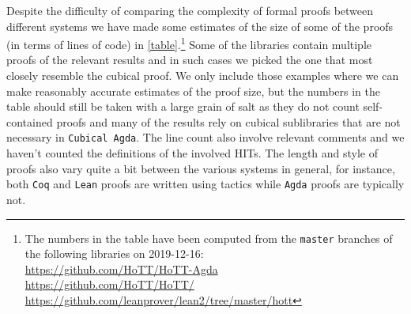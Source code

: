 Despite the difficulty of comparing the complexity of formal proofs
between different systems we have made some estimates of the size of
some of the proofs (in terms of lines of code) in
\cref{table}.\footnote{The numbers in the table have been computed
  from the \texttt{master} branches of the following libraries on
  2019-12-16:\\ \url{https://github.com/HoTT/HoTT-Agda}\\
  \url{https://github.com/HoTT/HoTT/}\\
  \url{https://github.com/leanprover/lean2/tree/master/hott}}
Some of the libraries contain multiple proofs of the relevant results
and in such cases we picked the one that most closely resemble the
cubical proof. We only include those examples where we can make
reasonably accurate estimates of the proof size, but the numbers in
the table should still be taken with a large grain of salt as they do
not count self-contained proofs and many of the results rely on
cubical sublibraries that are not necessary in \texttt{Cubical Agda}. The line
count also involve relevant comments and we haven't counted the
definitions of the involved HITs. The length and style of proofs also
vary quite a bit between the various systems in general, for instance,
both \texttt{Coq} and \texttt{Lean} proofs are written using tactics while \texttt{Agda} proofs
are typically not.

